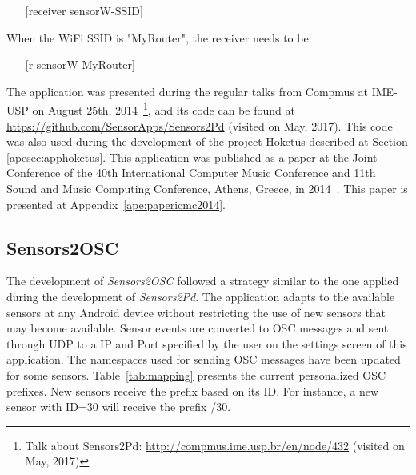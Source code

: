 \begin{itemize}\itemsep0em
	\item[]    [receiver sensorW-{SSID}]
\end{itemize}

When the WiFi SSID is "MyRouter", the receiver needs to be:

\begin{itemize}\itemsep0em
	\item[]    [r sensorW-MyRouter]
\end{itemize}

The application was presented during the regular talks from Compmus at IME-USP on August 25th, 2014~\footnote{Talk about Sensors2Pd: \url{http://compmus.ime.usp.br/en/node/432} (visited on May, 2017)}, and its code can be found at \url{https://github.com/SensorApps/Sensors2Pd} (visited on May, 2017).
This code was also used during the development of the project Hoketus described at Section \ref{apesec:apphoketus}.
This application was published as a paper at the Joint Conference of the 40th International Computer Music Conference and 11th Sound and Music Computing Conference, Athens, Greece, in 2014~\citep{deCarvalhoJunior2014sensors2pd}.
This paper is presented at Appendix~\ref{ape:papericmc2014}.

\subsection*{Sensors2OSC}
\label{apesubsec:appsensors2osc}

The development of \textit{Sensors2OSC} followed a strategy similar to the one applied during the development of \textit{Sensors2Pd}.
The application adapts to the available sensors at any Android device without restricting the use of new sensors that may become available.
Sensor events are converted to OSC messages and sent through UDP to a IP and Port specified by the user on the settings screen of this application.
The namespaces used for sending OSC messages have been updated for some sensors.
Table~\ref{tab:mapping} presents the current personalized OSC prefixes.
New sensors receive the prefix based on its ID. For instance, a new sensor with ID=30 will receive the prefix /30.

